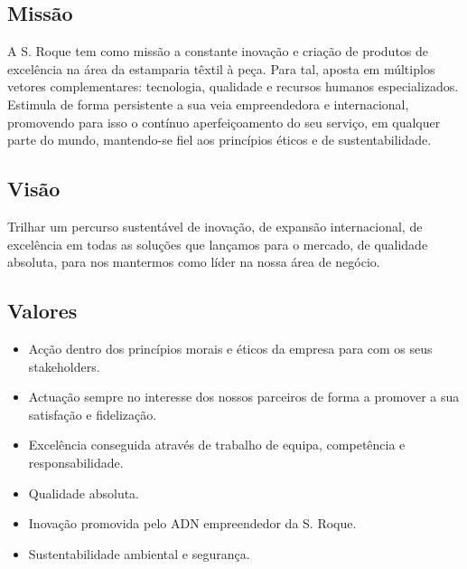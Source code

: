\subsection{Missão}

A S. Roque tem como missão a constante inovação e criação de produtos de excelência na área da estamparia têxtil à peça. Para tal, aposta em múltiplos vetores complementares: tecnologia, qualidade e recursos humanos especializados. Estimula de forma persistente a sua veia empreendedora e internacional, promovendo para isso o contínuo aperfeiçoamento do seu serviço, em qualquer parte do mundo, mantendo-se fiel aos princípios éticos e de sustentabilidade.\\

\subsection{Visão}
Trilhar um percurso sustentável de inovação, de expansão internacional, de excelência em todas as soluções que lançamos para o mercado, de qualidade absoluta, para nos mantermos como líder na nossa área de negócio.\\

\subsection{Valores}
\begin{itemize}
\item Acção dentro dos princípios morais e éticos da empresa para com os seus stakeholders.
\item Actuação sempre no interesse dos nossos parceiros de forma a promover a sua satisfação e fidelização.
\item Excelência conseguida através de trabalho de equipa, competência e responsabilidade.
\item Qualidade absoluta.
\item Inovação promovida pelo ADN empreendedor da S. Roque.
\item Sustentabilidade ambiental e segurança.
\end{itemize}



